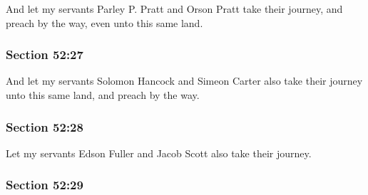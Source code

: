 		And let my servants Parley P. Pratt and Orson Pratt take their journey, and preach by the way, even unto this same land.


	\subsubsection{Section 52:27} %
		\label{DC52-27}

		And let my servants Solomon Hancock and Simeon Carter also take their journey unto this same land, and preach by the way.


	\subsubsection{Section 52:28} %
		\label{DC52-28}

		Let my servants Edson Fuller and Jacob Scott also take their journey.


	\subsubsection{Section 52:29} %
		\label{DC52-29}

